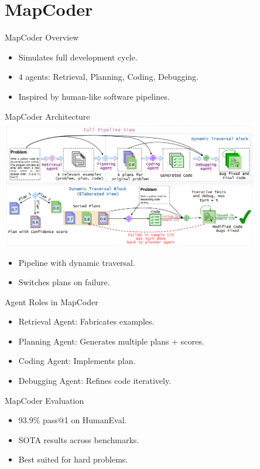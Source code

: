 \documentclass{beamer}
\begin{document}
	\section{MapCoder}
	\begin{frame}{MapCoder Overview}
	  \begin{itemize}
	    \item Simulates full development cycle.
	    \item 4 agents: Retrieval, Planning, Coding, Debugging.
	    \item Inspired by human-like software pipelines.
	  \end{itemize}
	\end{frame}
	
	\begin{frame}{MapCoder Architecture}
	  \includegraphics[width=0.85\textwidth]{mapcoder-architecture.png}
	  \begin{itemize}
	    \item Pipeline with dynamic traversal.
	    \item Switches plans on failure.
	  \end{itemize}
	\end{frame}
	
	\begin{frame}{Agent Roles in MapCoder}
	  \begin{itemize}
	    \item Retrieval Agent: Fabricates examples.
	    \item Planning Agent: Generates multiple plans + scores.
	    \item Coding Agent: Implements plan.
	    \item Debugging Agent: Refines code iteratively.
	  \end{itemize}
	\end{frame}
	
	\begin{frame}{MapCoder Evaluation}
	  \begin{itemize}
	    \item 93.9\% pass@1 on HumanEval.
	    \item SOTA results across benchmarks.
	    \item Best suited for hard problems.
	  \end{itemize}
	\end{frame}
	
\end{document}
